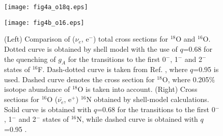 \documentclass[preprint,12pt]{elsarticle}
\begin{document}
\begin{figure}[htbp]
\hspace{-10mm}
\begin{minipage}{0.45\hsize}
\begin{center}
\texttt{[image: fig4a\_o18q.eps]}
\end{center}
\end{minipage}
\hspace{8mm}
\begin{minipage}{0.45\hsize}
\begin{center}
\texttt{[image: fig4b\_o16.eps]}
\end{center}
\end{minipage}
\vspace{-2.5cm}
\caption{\small 
(Left) Comparison of ($\nu_e$, e$^{-}$) total cross sections for $^{18}$O and $^{16}$O. 
Dotted curve is obtained by shell model with the use of $q$=0.68 for the quenching of $g_A$ for the transitions to the first 0$^{-}$, 1$^{-}$ and 2$^{-}$ states of $^{16}$F.
Dash-dotted curve is taken from Ref. \cite{SC2018}, where $q$=0.95 is used.
Dashed curve denotes the cross section for $^{18}$O, where 0.205$\%$ isotope abundance of $^{18}$O is taken into account.
(Right) Cross sections for $^{16}$O ($\bar{\nu_e}$, e$^{+}$) $^{16}$N obtained by shell-model calculations. 
Solid curve is obtained with $q$=0.68 for the transitions to the first 0$^{-}$, 1$^{-}$ and 2$^{-}$ states of $^{16}$N, while dashed curve is obtained with $q$=0.95 \cite{SC2018}.
}
\label{1816O}
\end{figure}
\end{document}
